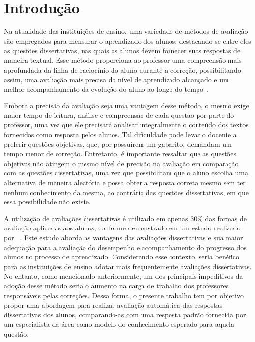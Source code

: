 \chapter{Introdução}

Na atualidade das instituições de ensino, uma variedade de métodos de avaliação são empregados para mensurar o aprendizado dos alunos, destacando-se entre eles as questões dissertativas, nas quais os alunos devem fornecer suas respostas de maneira textual. Esse método proporciona ao professor uma compreensão mais aprofundada da linha de raciocínio do aluno durante a correção, possibilitando assim, uma avaliação mais precisa do nível de aprendizado alcançado e um melhor acompanhamento da evolução do aluno ao longo do tempo~\cite{artigoPorcentagemQuestoes}.

Embora a precisão da avaliação seja uma vantagem desse método, o mesmo exige maior tempo de leitura, análise e compreensão de cada questão por parte do professor, uma vez que ele precisará analisar integralmente o conteúdo dos textos fornecidos como resposta pelos alunos. Tal dificuldade pode levar o docente a preferir questões objetivas, que, por possuírem um gabarito, demandam um tempo menor de correção. Entretanto, é importante ressaltar que as questões objetivas não atingem o mesmo nível de precisão na avaliação em comparação com as questões dissertativas, uma vez que possibilitam que o aluno escolha uma alternativa de maneira aleatória e possa obter a resposta correta mesmo sem ter nenhum conhecimento da mesma, ao contrário das questões dissertativas, em que essa possibilidade não existe.

A utilização de avaliações dissertativas é utilizado em apenas 30\% das formas de avaliação aplicadas aos alunos, conforme demonstrado em um estudo realizado por %
 ~\cite{artigoPorcentagemQuestoes}. Este estudo aborda as vantagens das avaliações dissertativas e sua maior adequação para a avaliação do desempenho e acompanhamento do progresso dos alunos no processo de aprendizado. Considerando esse contexto, seria benéfico para as instituições de ensino adotar mais frequentemente avaliações dissertativas. No entanto, como mencionado anteriormente, um dos principais impeditivos da adoção desse método seria o aumento na carga de trabalho dos professores responsáveis pelas correções. Dessa forma, o presente trabalho tem por objetivo propor uma abordagem para realizar avaliação automática das respostas dissertativas dos alunos, comparando-as com uma resposta padrão fornecida por um especialista da área como modelo do conhecimento esperado para aquela questão.

